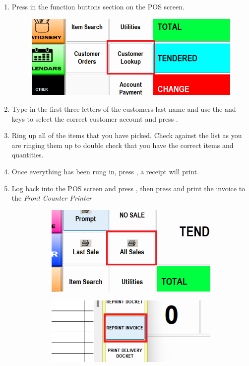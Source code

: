 \documentclass[a4paper, 12pt]{article}
\begin{document}
\begin{enumerate}
    \item Press  in the function buttons section on the POS screen.
    \begin{figure}[h]
        \centering
        \includegraphics[width=0.5\linewidth]{images/customerlookup.png}
    \end{figure}
    \item Type in the first three letters of the customers last name and use the \keys{\arrowkeyup} and \keys{\arrowkeydown} keys to select the correct customer account and press \keys{\enter}.
    \item Ring up all of the items that you have picked. Check against the list as you are ringing them up to double check that you have the correct items and quantities.
    \item Once everything has been rung in, press , a receipt will print.
    \item Log back into the POS screen and press , then press  and print the invoice to the \textit{Front Counter Printer}
    \begin{figure}[h]
    \centering
        \hfill
        \begin{subfigure}{0.4\linewidth}
            \centering
            \includegraphics[width=\linewidth]{images/allsales.png}
        \end{subfigure}
        \hfill
        \begin{subfigure}[b]{0.4\linewidth}
            \centering
            \includegraphics[width=\linewidth]{images/reprintinvoice.png} 
        \end{subfigure}
        \hfill
    \end{figure}
    

\end{enumerate}
\end{document}
